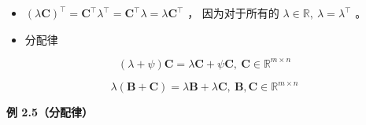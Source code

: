 \begin{itemize}
\item $ (\lambda \boldsymbol{C})^{\top} = \boldsymbol{C}^{\top} \lambda^{\top} = \boldsymbol{C}^{\top} \lambda = \lambda \boldsymbol{C}^{\top} $ ， 因为对于所有的 $ \lambda \in \mathbb{R}, \ \lambda = \lambda^{\top} $ 。
\end{itemize}

\begin{itemize}
\item 分配律 
\end{itemize}

\begin{equation*}
(\lambda + \psi) \boldsymbol{C} = \lambda \boldsymbol{C} + \psi \boldsymbol{C}, \ \boldsymbol{C} \in \mathbb{R}^{m \times n}
\end{equation*}

\begin{equation*}
\lambda (\boldsymbol{B} + \boldsymbol{C}) = \lambda \boldsymbol{B} + \lambda \boldsymbol{C}, \ \boldsymbol {B,C} \in \mathbb{R}^{m \times n}
\end{equation*}

\begin{notebox}
\textbf{例 2.5（分配律）}
\end{notebox}


